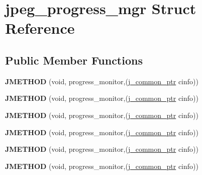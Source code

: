 \hypertarget{structjpeg__progress__mgr}{}\section{jpeg\+\_\+progress\+\_\+mgr Struct Reference}
\label{structjpeg__progress__mgr}
\subsection*{Public Member Functions}
\begin{DoxyCompactItemize}
\item 
\mbox{\label{structjpeg__progress__mgr_aa6fbc36158dd82f586d752f976ad7fa3}} 
{\bfseries J\+M\+E\+T\+H\+OD} (void, progress\+\_\+monitor,(\hyperlink{structjpeg__common__struct}{j\+\_\+common\+\_\+ptr} cinfo))
\item 
\mbox{\label{structjpeg__progress__mgr_aa6fbc36158dd82f586d752f976ad7fa3}} 
{\bfseries J\+M\+E\+T\+H\+OD} (void, progress\+\_\+monitor,(\hyperlink{structjpeg__common__struct}{j\+\_\+common\+\_\+ptr} cinfo))
\item 
\mbox{\label{structjpeg__progress__mgr_aa6fbc36158dd82f586d752f976ad7fa3}} 
{\bfseries J\+M\+E\+T\+H\+OD} (void, progress\+\_\+monitor,(\hyperlink{structjpeg__common__struct}{j\+\_\+common\+\_\+ptr} cinfo))
\item 
\mbox{\label{structjpeg__progress__mgr_aa6fbc36158dd82f586d752f976ad7fa3}} 
{\bfseries J\+M\+E\+T\+H\+OD} (void, progress\+\_\+monitor,(\hyperlink{structjpeg__common__struct}{j\+\_\+common\+\_\+ptr} cinfo))
\item 
\mbox{\label{structjpeg__progress__mgr_aa6fbc36158dd82f586d752f976ad7fa3}} 
{\bfseries J\+M\+E\+T\+H\+OD} (void, progress\+\_\+monitor,(\hyperlink{structjpeg__common__struct}{j\+\_\+common\+\_\+ptr} cinfo))
\item 
\mbox{\label{structjpeg__progress__mgr_aa6fbc36158dd82f586d752f976ad7fa3}} 
{\bfseries J\+M\+E\+T\+H\+OD} (void, progress\+\_\+monitor,(\hyperlink{structjpeg__common__struct}{j\+\_\+common\+\_\+ptr} cinfo))
\item 

\end{DoxyCompactItemize}
